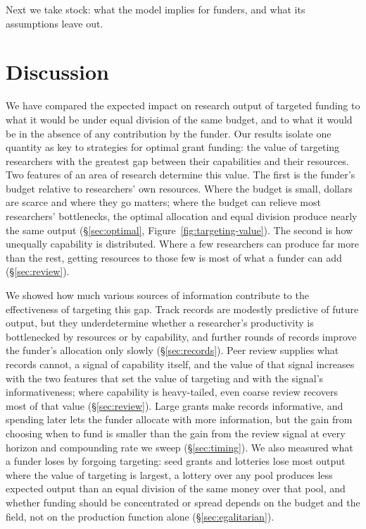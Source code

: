 \documentclass[article, 11pt, reqno]{amsart}
\theoremstyle{named}
\begin{document}


Next we take stock: what the model implies for funders, and what its assumptions leave out.

\section{Discussion}\label{sec:discussion}

We have compared the expected impact on research output of targeted funding to what it would be under equal division of the same budget, and to what it would be in the absence of any contribution by the funder. Our results isolate one quantity as key to strategies for optimal grant funding: the value of targeting researchers with the greatest gap between their capabilities and their resources. Two features of an area of research determine this value. The first is the funder's budget relative to researchers' own resources. Where the budget is small, dollars are scarce and where they go matters; where the budget can relieve most researchers' bottlenecks, the optimal allocation and equal division produce nearly the same output (\S\ref{sec:optimal}, Figure~\ref{fig:targeting-value}). The second is how unequally capability is distributed. Where a few researchers can produce far more than the rest, getting resources to those few is most of what a funder can add (\S\ref{sec:review}).

We showed how much various sources of information contribute to the effectiveness of targeting this gap. Track records are modestly predictive of future output, but they underdetermine whether a researcher's productivity is bottlenecked by resources or by capability, and further rounds of records improve the funder's allocation only slowly (\S\ref{sec:records}). Peer review supplies what records cannot, a signal of capability itself, and the value of that signal increases with the two features that set the value of targeting and with the signal's informativeness; where capability is heavy-tailed, even coarse review recovers most of that value (\S\ref{sec:review}). Large grants make records informative, and spending later lets the funder allocate with more information, but the gain from choosing when to fund is smaller than the gain from the review signal at every horizon and compounding rate we sweep (\S\ref{sec:timing}). We also measured what a funder loses by forgoing targeting: seed grants and lotteries lose most output where the value of targeting is largest, a lottery over any pool produces less expected output than an equal division of the same money over that pool, and whether funding should be concentrated or spread depends on the budget and the field, not on the production function alone (\S\ref{sec:egalitarian}).
\end{document}
